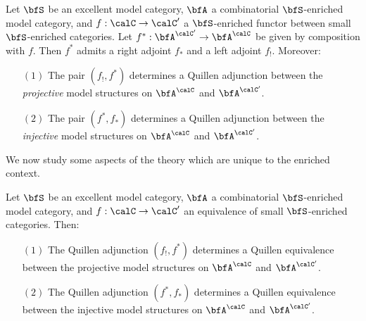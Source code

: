 \begin{proposition}\label{colbin}
Let $\bfS$ be an excellent model category, $\bfA$ a combinatorial $\bfS$-enriched
model category, and $f: \calC \rightarrow \calC'$ a $\bfS$-enriched functor between
small $\bfS$-enriched categories. Let
$f^{\ast}: \bfA^{\calC'} \rightarrow \bfA^{\calC}$ be given
by composition with $f$. Then $f^{\ast}$ admits a right adjoint
$f_{\ast}$ and a left adjoint $f_{!}$. Moreover:

\begin{itemize}
\item[$(1)$] The pair $( f_{!}, f^{\ast} )$ determines a Quillen
adjunction between the {\em projective} model structures on
$\bfA^{\calC}$ and $\bfA^{\calC'}$.

\item[$(2)$] The pair $( f^{\ast}, f_{\ast} )$ determines a
Quillen adjunction between the {\em injective} model structures on
$\bfA^{\calC}$ and $\bfA^{\calC'}$.
\end{itemize}
\end{proposition}

We now study some aspects of the theory which are unique to the enriched context.

\begin{proposition}\label{lesstrick}
Let $\bfS$ be an excellent model category,
$\bfA$ a combinatorial $\bfS$-enriched model category, and 
$f: \calC \rightarrow \calC'$ an equivalence of small $\bfS$-enriched categories. 
Then:

\begin{itemize}
\item[$(1)$] The Quillen adjunction $(f_{!}, f^{\ast})$ determines a Quillen equivalence between
the projective model structures on $\bfA^{\calC}$ and $\bfA^{\calC'}$. 

\item[$(2)$] The Quillen adjunction $(f^{\ast}, f_{\ast})$ determines a Quillen equivalence between
the injective model structures on $\bfA^{\calC}$ and $\bfA^{\calC'}$.
\end{itemize}

\end{proposition}



